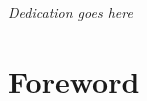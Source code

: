 \setlength{\parindent}{2em}
{
\centering
\textit{\large Dedication goes here\\}
}
\section*{Foreword}
\lipsum[3-4]

